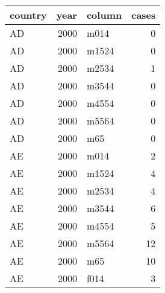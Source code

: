 \begin{tabular}{lrlr}
  \toprule
 country & year & column & cases \\ 
  \midrule
  AD & 2000 & m014 &   0 \\ 
  AD & 2000 & m1524 &   0 \\ 
  AD & 2000 & m2534 &   1 \\ 
  AD & 2000 & m3544 &   0 \\ 
  AD & 2000 & m4554 &   0 \\ 
  AD & 2000 & m5564 &   0 \\ 
  AD & 2000 & m65 &   0 \\ 
  AE & 2000 & m014 &   2 \\ 
  AE & 2000 & m1524 &   4 \\ 
  AE & 2000 & m2534 &   4 \\ 
  AE & 2000 & m3544 &   6 \\ 
  AE & 2000 & m4554 &   5 \\ 
  AE & 2000 & m5564 &  12 \\ 
  AE & 2000 & m65 &  10 \\ 
  AE & 2000 & f014 &   3 \\ 
   \bottomrule
\end{tabular}
